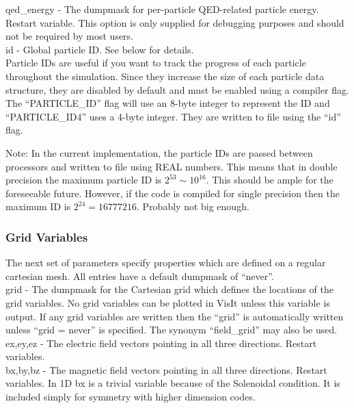 {\emphtext qed\_energy} - The dumpmask for per-particle QED-related particle
  energy.
  Restart variable. This option is only supplied for debugging purposes and
  should not be required by most users.\\

{\emphtext id} - Global particle ID. See below for details.\\

Particle IDs are useful if you want to track the progress
of each particle throughout the simulation. Since they increase
the size of each particle data structure, they are disabled by
default and must be enabled using a compiler flag.
The ``PARTICLE\_ID'' flag will use an 8-byte integer to represent the
ID and ``PARTICLE\_ID4'' uses a 4-byte integer.
They are written to file using the ``id'' flag.

Note: In the current implementation, the particle IDs are
passed between processors and written to file using REAL numbers.
This means that in double precision the maximum particle ID
is $2^{53} \sim 10^{16}$. This should be ample for the foreseeable future.
However, if the code is compiled for single precision then the
maximum ID is $2^{24} = 16777216$. Probably not big enough.


\subsubsection{Grid Variables}
The next set of parameters specify properties which are defined on a
regular cartesian mesh. All entries have a default
dumpmask of ``never''.\\

{\emphtext grid} - The dumpmask for the Cartesian grid which defines the
locations of the grid variables. No grid variables can be plotted in VisIt
unless this variable is output.
If any grid variables are written then the
``grid'' is automatically written unless ``grid = never''
is specified.
The synonym ``field\_grid'' may also be used.\\

{\emphtext ex,\;ey,\;ez} - The electric field vectors pointing in all three
directions. Restart variables.\\

{\emphtext bx,\;by,\;bz} - The magnetic field vectors pointing in all three
directions. Restart variables. In 1D bx is a trivial variable because of the
Solenoidal condition. It is included simply for symmetry with higher dimension
codes.\\


